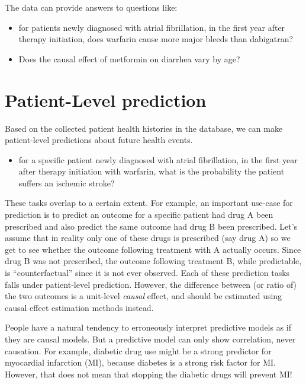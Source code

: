 \documentclass[]{book}
\providecommand{\tightlist}{%
  \setlength{\itemsep}{0pt}\setlength{\parskip}{0pt}}
\let\BeginKnitrBlock\begin \let\EndKnitrBlock\end
\begin{document}
The data can provide answers to questions like:

\begin{itemize}
\tightlist
\item
  for patients newly diagnosed with atrial fibrillation, in the first
  year after therapy initiation, does warfarin cause more major bleeds
  than dabigatran?
\item
  Does the causal effect of metformin on diarrhea vary by age?
\end{itemize}

\section{Patient-Level prediction}\label{patient-level-prediction}

Based on the collected patient health histories in the database, we can
make patient-level predictions about future health events.

\begin{itemize}
\tightlist
\item
  for a specific patient newly diagnosed with atrial fibrillation, in
  the first year after therapy initiation with warfarin, what is the
  probability the patient suffers an ischemic stroke?
\end{itemize}

These tasks overlap to a certain extent. For example, an important
use-case for prediction is to predict an outcome for a specific patient
had drug A been prescribed and also predict the same outcome had drug B
been prescribed. Let's assume that in reality only one of these drugs is
prescribed (say drug A) so we get to see whether the outcome following
treatment with A actually occurs. Since drug B was not prescribed, the
outcome following treatment B, while predictable, is ``counterfactual''
since it is not ever observed. Each of these prediction tasks falls
under patient-level prediction. However, the difference between (or
ratio of) the two outcomes is a unit-level \emph{causal} effect, and
should be estimated using causal effect estimation methods instead.

\BeginKnitrBlock{rmdimportant}
People have a natural tendency to erroneously interpret predictive
models as if they are causal models. But a predictive model can only
show correlation, never causation. For example, diabetic drug use might
be a strong predictor for myocardial infarction (MI), because diabetes
is a strong risk factor for MI. However, that does not mean that
stopping the diabetic drugs will prevent MI!
\EndKnitrBlock{rmdimportant}
\end{document}
